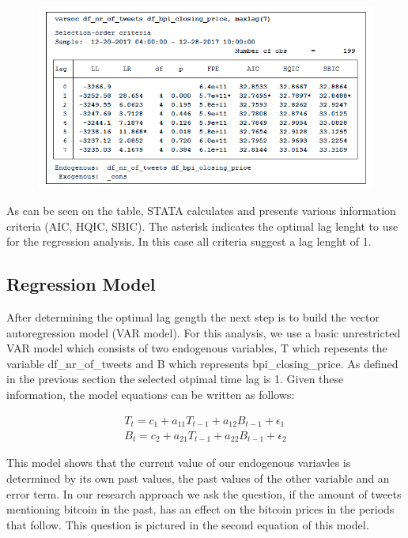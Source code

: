 \documentclass[a4paper,american,12pt]{article}
\begin{document}
\begin{spacing}{1.2}
\begin{figure}[H]
\centering
\graphicspath{ {stata_export_graphs/} }
\includegraphics[scale=0.85]{LAG_crit_df_nr_tweets_df_bpi.png}
\end{figure}

As can be seen on the table, STATA calculates and presents various information criteria (AIC, HQIC, SBIC). The asterisk indicates the optimal lag lenght to use for the regression analysis. In this case all criteria suggest a lag lenght of 1.
		
\subsection{Regression Model}
After determining the optimal lag gength the next step is to build the vector autoregression model (VAR model).
For this analysis, we use a basic unrestricted VAR model which consists of two endogenous variables, T which repesents the variable df\_nr\_of\_tweets and B which represents bpi\_closing\_price. As defined in the previous section the selected otpimal time lag is 1. Given these information, the model equations can be written as follows:

\begin{equation}
\begin{split}
T_t = c_1 + a_{11}T_{t-1} + a_{12}B_{t-1} + \epsilon_1 \\
B_t = c_2 + a_{21}T_{t-1} + a_{22}B_{t-1} + \epsilon_2
\end{split}
\end{equation}

This model shows that the current value of our endogenous variavles is determined by its own past values, the past values of the other variable and an error term. In our research approach we ask the question, if the amount of tweets mentioning bitcoin in the past, has an effect on the bitcoin prices in the periods that follow. This question is pictured in the second equation of this model.\\


\end{spacing}
\end{document}
